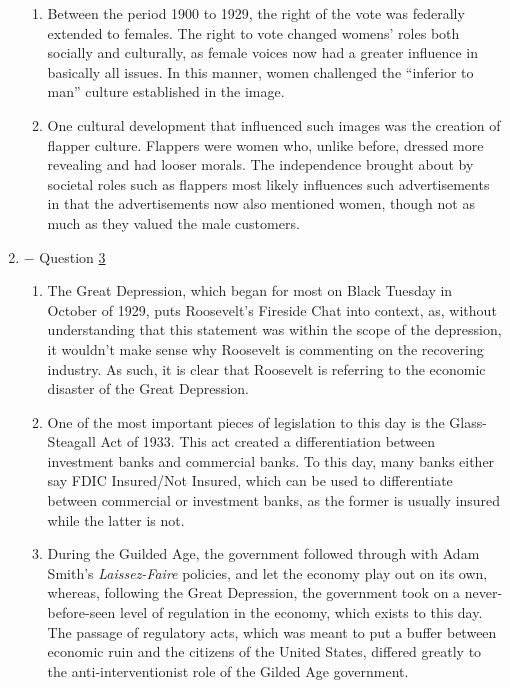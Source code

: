 \documentclass[12pt]{article}
\begin{document}
\begin{enumerate}
\begin{enumerate}
      \item Between the period 1900 to 1929, the right of the vote was federally extended to females. The right to vote changed womens' roles both socially and culturally, as female voices now had a greater influence in basically all issues. In this manner, women challenged the “inferior to man” culture established in the image.

      \item One cultural development that influenced such images was the creation of flapper culture. Flappers were women who, unlike before, dressed more revealing and had looser morals. The independence brought about by societal roles such as flappers most likely influences such advertisements in that the advertisements now also mentioned women, though not as much as they valued the male customers.

    \end{enumerate}

    \newpage

  \item $-$ Question \underline{3}

    \begin{enumerate}

      \item The Great Depression, which began for most on Black Tuesday in October of 1929, puts Roosevelt's Fireside Chat into context, as, without understanding that this statement was within the scope of the depression, it wouldn't make sense why Roosevelt is commenting on the recovering industry. As such, it is clear that Roosevelt is referring to the economic disaster of the Great Depression.

      \item One of the most important pieces of legislation to this day is the Glass-Steagall Act of 1933. This act created a differentiation between investment banks and commercial banks. To this day, many banks either say FDIC Insured/Not Insured, which can be used to differentiate between commercial or investment banks, as the former is usually insured while the latter is not.

      \item During the Guilded Age, the government followed through with Adam Smith's \textit{Laissez-Faire} policies, and let the economy play out on its own, whereas, following the Great Depression, the government took on a never-before-seen level of regulation in the economy, which exists to this day. The passage of regulatory acts, which was meant to put a buffer between economic ruin and the citizens of the United States, differed greatly to the anti-interventionist role of the Gilded Age government.

    \end{enumerate}

\end{enumerate}
\end{document}

